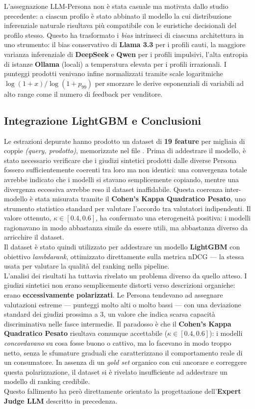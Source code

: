 \noindent
L'assegnazione LLM-Persona non è stata casuale ma motivata dallo studio
precedente: a ciascun profilo è stato abbinato il modello la cui distribuzione
inferenziale naturale risultava più compatibile con le euristiche decisionali
del profilo stesso. Questo ha trasformato i \textit{bias} intrinseci di
ciascuna architettura in uno strumento: il bias
conservativo di \textbf{Llama 3.3} per i profili cauti, la maggiore
varianza inferenziale di \textbf{DeepSeek} e \textbf{Qwen} per i profili
impulsivi, l'alta entropia di istanze \textbf{Ollama} (locali) a temperatura elevata
per i profili irrazionali. I punteggi prodotti venivano infine normalizzati
tramite scale logaritmiche $\log(1+x)/\log(1+p_{99})$ per smorzare le
derive esponenziali di variabili ad alto range come il numero di feedback
per venditore.

\subsection*{Integrazione LightGBM e Conclusioni}
Le estrazioni depurate hanno prodotto un dataset di \textbf{19 feature}
per migliaia di coppie \emph{(query, prodotto)}, memorizzate nel file
. Prima di addestrare il modello, è stato
necessario verificare che i giudizi sintetici prodotti dalle diverse
Persona fossero sufficientemente coerenti tra loro ma non identici:
una convergenza totale avrebbe indicato che i modelli si stavano
semplicemente copiando, mentre una divergenza eccessiva avrebbe reso
il dataset inaffidabile. Questa coerenza inter-modello è stata misurata
tramite il \textbf{Cohen's Kappa Quadratico Pesato}, uno strumento
statistico standard per valutare l'accordo tra valutatori indipendenti.
Il valore ottenuto, $\kappa \in [0.4, 0.6]$, ha confermato una
eterogeneità positiva: i modelli ragionavano in modo abbastanza simile
da essere utili, ma abbastanza diverso da arricchire il dataset.\\

\noindent
Il dataset è stato quindi utilizzato per addestrare un modello
\textbf{LightGBM} con obiettivo \textit{lambdarank}, ottimizzato
direttamente sulla metrica nDCG — la stessa usata per valutare la
qualità del ranking nella pipeline.\\

\noindent
L'analisi dei risultati ha tuttavia rivelato un problema diverso da quello
atteso. I giudizi sintetici non erano semplicemente distorti verso descrizioni
organiche: erano \textbf{eccessivamente polarizzati}. Le Persona tendevano
ad assegnare valutazioni estreme — punteggi molto alti o molto bassi —
con una deviazione standard dei giudizi prossima a $3$, un valore che
indica scarsa capacità discriminativa nelle fasce intermedie. Il paradosso
è che il \textbf{Cohen's Kappa Quadratico Pesato} risultava comunque
accettabile ($\kappa \in [0.4, 0.6]$): i modelli \emph{concordavano}
su cosa fosse buono o cattivo, ma lo facevano in modo troppo netto,
senza le sfumature graduali che caratterizzano il comportamento reale
di un consumatore. In assenza di un \textit{gold set} organico con cui
ancorare e correggere questa polarizzazione, il dataset si è rivelato
insufficiente ad addestrare un modello di ranking credibile.\\

\noindent
Questo fallimento ha però direttamente orientato la progettazione
dell'\textbf{Expert Judge LLM} descritto in precedenza.